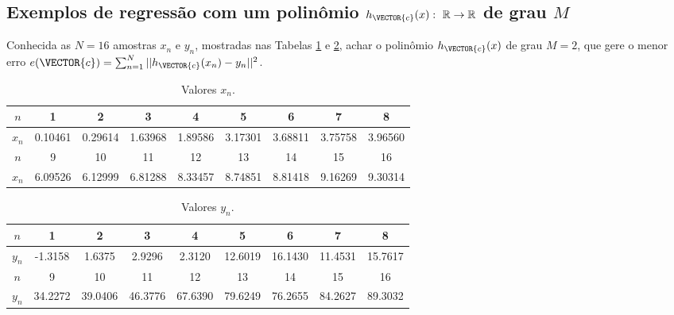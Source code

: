 \subsection{Exemplos de regressão com um polinômio
$h_{\VECTOR{c}}(x):~\mathbb{R} \rightarrow \mathbb{R}$ de grau $M$ }

\begin{example}\label{ex:theo:maphxr1r1}
Conhecida as $N=16$ amostras $x_n$ e $y_n$, 
mostradas nas  Tabelas \ref{table:theo:maphxr1r1:xn} e \ref{table:theo:maphxr1r1:yn},
achar o polinômio $h_{\VECTOR{c}}(x)$ de grau $M=2$, 
que gere o menor erro $e(\VECTOR{c}) =  \sum_{n=1}^{N} ||h_{\VECTOR{c}}(x_n)-y_n||^2$.
\end{example}


\begin{table}[h!]
\centering
\begin{tabular}{|c|c|c|c|c|c|c|c|c|} 
 \hline
$n$   & 1 & 2 & 3 & 4 & 5 & 6 & 7 & 8\\ \hline
$x_n$ & 0.10461 & 0.29614 & 1.63968 & 1.89586 & 3.17301 & 3.68811 & 3.75758 & 3.96560 \\ \hline
 \hline
$n$   & 9 & 10 & 11 & 12 & 13 & 14 & 15 & 16\\  \hline
$x_n$ & 6.09526 & 6.12999 & 6.81288 & 8.33457 & 8.74851 & 8.81418 & 9.16269 & 9.30314 \\ \hline
\end{tabular}
\caption{Valores $x_n$.}
\label{table:theo:maphxr1r1:xn}
\end{table}

\begin{table}[h!]
\centering
\begin{tabular}{|c|c|c|c|c|c|c|c|c|} 
 \hline
$n$   & 1 & 2 & 3 & 4 & 5 & 6 & 7 & 8\\ \hline
$y_n$ & -1.3158 & 1.6375 & 2.9296 & 2.3120 & 12.6019 & 16.1430 & 11.4531 & 15.7617  \\ \hline
 \hline
$n$   & 9 & 10 & 11 & 12 & 13 & 14 & 15 & 16\\  \hline
$y_n$ & 34.2272 & 39.0406 & 46.3776 & 67.6390 & 79.6249 & 76.2655 & 84.2627 & 89.3032 \\ \hline
\end{tabular}
\caption{Valores $y_n$.}
\label{table:theo:maphxr1r1:yn}
\end{table}

